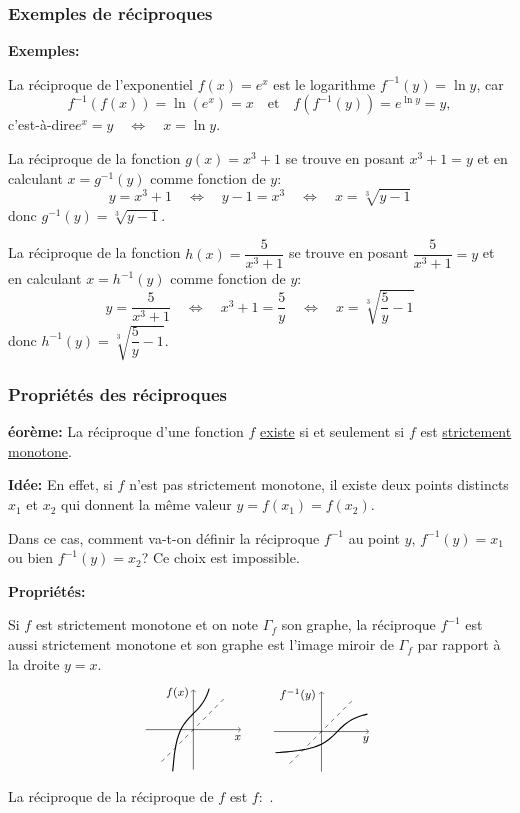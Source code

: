\begin{frame}[plain]
\frametitle{\bf Exemples de r\'eciproques}
\medskip 

{\small 
{\bf Exemples:}
\begin{itemize}
\bitem
La r\'eciproque de l'exponentiel $f(x)=e^x$ est le logarithme 
$f^{-1}(y)=\ln y$, car 
$$
f^{-1}(f(x))=\ln(e^x)=x \quad\mbox{et}\quad 
f(f^{-1}(y))=e^{\ln y}=y, 
$$
c'est-\`a-dire\quad $e^x=y\quad\Longleftrightarrow\quad x=\ln y$. 
\vspace*{2mm}

\pause
\bitem
La r\'eciproque de la fonction $g(x)=x^3+1$ se trouve en posant $x^3+1=y$ 
et en calculant $x=g^{-1}(y)$ comme fonction de $y$: 
$$
y=x^3+1 \quad\Longleftrightarrow\quad y-1=x^3 \quad\Longleftrightarrow\quad 
x=\sqrt[3]{y-1}
$$
donc $g^{-1}(y)=\sqrt[3]{y-1}$. 
\vspace*{2mm}

\pause
\bitem
La r\'eciproque de la fonction $h(x)=\dfrac{5}{x^3+1}$ se trouve en posant 
$\dfrac{5}{x^3+1}=y$ et en calculant $x=h^{-1}(y)$ comme fonction de $y$: 
$$
y=\dfrac{5}{x^3+1} \quad\Longleftrightarrow\quad x^3+1=\dfrac{5}{y} 
\quad\Longleftrightarrow\quad 
x=\sqrt[3]{\dfrac{5}{y}-1}
$$
donc $h^{-1}(y)=\sqrt[3]{\dfrac{5}{y}-1}$. 
\end{itemize}

}

\end{frame}


\begin{frame}
\frametitle{\bf Propri\'et\'es des r\'eciproques}
\medskip 

{\bf \th\'eor\`eme:}\quad 
La r\'eciproque d'une fonction $f$ \underline{existe} si et seulement si 
$f$ est \underline{strictement monotone}. 
\vspace*{1mm}

\pause
{\small 
{\bf Id\'ee:}\quad 
En effet, si $f$ n'est pas strictement monotone, il existe deux points 
distincts $x_1$ et $x_2$ qui donnent la m\^eme valeur $y=f(x_1)=f(x_2)$. 

Dans ce cas, comment va-t-on d\'efinir la r\'eciproque $f^{-1}$ au point $y$, 
$f^{-1}(y)=x_1$ ou bien $f^{-1}(y)=x_2$? Ce choix est impossible.}
\vspace*{1mm}

\pause
{\bf Propri\'et\'es:}
\begin{itemize}
\bitem
Si $f$ est strictement monotone et on note $\Gamma_f$ son graphe, 
la r\'eciproque $f^{-1}$ est aussi strictement monotone et son graphe 
est l'image miroir de $\Gamma_f$ par rapport \`a la droite $y=x$. 
$$
\grapheFF \qquad \grapheFFINV
$$

\pause
\bitem
La r\'eciproque de la r\'eciproque de $f$ est $f$:\ 
.
\end{itemize}

\end{frame}

